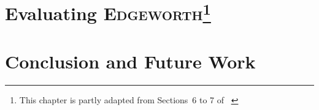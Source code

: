 \documentclass[12pt]{cmuthesis}
\let\cleardoublepage\clearpage
\newcommand*{\Edgeworth}{\textsc{Edgeworth}\xspace}
\begin{document}
\chapter[Evaluating \Edgeworth{}]{Evaluating \Edgeworth{}\footnote{This chapter is partly adapted from Sections~6 to 7 of ~\cite{ni_edgeworth_2024}}}
\label{chp:edgeworth-eval}


\chapter{Conclusion and Future Work}
\label{chp:conclusion}


% 

\backmatter

\renewcommand{\baselinestretch}{1.0}\normalsize

% 

\cleardoublepage
\printbibliography[heading=bibintoc]
% 
\end{document}
